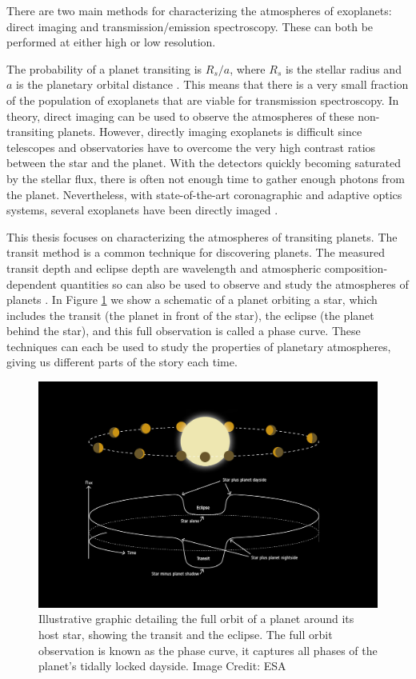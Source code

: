 There are two main methods for characterizing the atmospheres of exoplanets: direct imaging and transmission/emission spectroscopy. These can both be performed at either high or low resolution.

The probability of a planet transiting is $R_s/a$, where $R_s$ is the stellar radius and $a$ is the planetary orbital distance \citep{Borucki1984}. This means that there is a very small fraction of the population of exoplanets that are viable for transmission spectroscopy. In theory, direct imaging can be used to observe the atmospheres of these non-transiting planets. However, directly imaging exoplanets is difficult since telescopes and observatories have to overcome the very high contrast ratios between the star and the planet. With the detectors quickly becoming saturated by the stellar flux, there is often not enough time to gather enough photons from the planet. Nevertheless, with state-of-the-art coronagraphic and adaptive optics systems, several exoplanets have been directly imaged \citep[e.g.,][]{Marois2008,Marois2010,Lagrange2010,Rameau2013,Kuzuhara2013}.

This thesis focuses on characterizing the atmospheres of transiting planets. The transit method is a common technique for discovering planets. The measured transit depth and eclipse depth are wavelength and atmospheric composition-dependent quantities so can also be used to observe and study the atmospheres of planets \citep[e.g.,][]{Seager2000a, Brown2001, Charbonneau2005, Deming2005a}. In Figure \ref{int:fig:phasecurve} we show a schematic of a planet orbiting a star, which includes the transit (the planet in front of the star), the eclipse (the planet behind the star), and this full observation is called a phase curve. These techniques can each be used to study the properties of planetary atmospheres, giving us different parts of the story each time.

\begin{figure}
    \centering
    \includegraphics[width = \linewidth]{Exoplanet_phase_curve.jpg}
    \caption{Illustrative graphic detailing the full orbit of a planet around its host star, showing the transit and the eclipse. The full orbit observation is known as the phase curve, it captures all phases of the planet's tidally locked dayside. Image Credit: ESA}
    \label{int:fig:phasecurve}
\end{figure}

